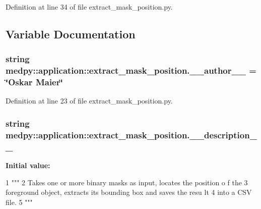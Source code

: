 Definition at line 34 of file extract\_\-mask\_\-position.py.



\subsection{Variable Documentation}
\hypertarget{namespacemedpy_1_1application_1_1extract__mask__position_af699933eba341cf2fad62194997dded2}{
\subsubsection[{\_\-\_\-author\_\-\_\-}]{\setlength{\rightskip}{0pt plus 5cm}string {\bf medpy::application::extract\_\-mask\_\-position.\_\-\_\-author\_\-\_\-} = \char`\"{}Oskar Maier\char`\"{}}}
\label{namespacemedpy_1_1application_1_1extract__mask__position_af699933eba341cf2fad62194997dded2}


Definition at line 23 of file extract\_\-mask\_\-position.py.

\hypertarget{namespacemedpy_1_1application_1_1extract__mask__position_a7a396ee1f669442ace08a8650397af21}{
\subsubsection[{\_\-\_\-description\_\-\_\-}]{\setlength{\rightskip}{0pt plus 5cm}string {\bf medpy::application::extract\_\-mask\_\-position.\_\-\_\-description\_\-\_\-}}}
\label{namespacemedpy_1_1application_1_1extract__mask__position_a7a396ee1f669442ace08a8650397af21}
{\bfseries Initial value:}
\begin{DoxyCode}
1 """
2                   Takes one or more binary masks as input, locates the position o
      f the
3                   foreground object, extracts its bounding box and saves the resu
      lt
4                   into a CSV file.
5                   """
\end{DoxyCode}


